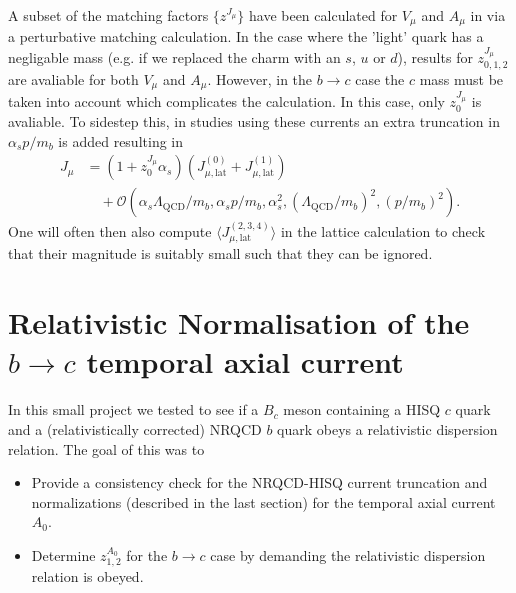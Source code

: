 A subset of the matching factors $\{z^{J_{\mu}}\}$ have been calculated for $V_{\mu}$ and $A_{\mu}$ in \cite{Monahan:2012dq} via a perturbative matching calculation. In the case where the 'light' quark has a negligable mass (e.g. if we replaced the charm with an $s$, $u$ or $d$), results for $z^{J_{\mu}}_{0,1,2}$ are avaliable for both $V_{\mu}$ and $A_{\mu}$. However, in the $b\to c$ case the $c$ mass must be taken into account which complicates the calculation. In this case, only $z^{J_{\mu}}_{0}$ is avaliable. To sidestep this, in studies using these currents an extra truncation in $\alpha_s p/m_b$ is added resulting in
\begin{align}
  \label{eq:nrqcd-hisq-current-truncate}
  J_{\mu} &= ( 1 + z^{J_{\mu}}_0 \alpha_s )( J_{\mu,\text{lat}}^{(0)} + J_{\mu,\text{lat}}^{(1)} ) \\ \nonumber &\quad + \mathcal{O}( \alpha_s \Lambda_{\text{QCD}} / m_b, \alpha_s p/m_b,  \alpha_s^2, (\Lambda_{\text{QCD}}/m_b)^2, (p/m_b)^2 ).
\end{align}
One will often then also compute $\langle J_{\mu,\text{lat}}^{(2,3,4)}\rangle$ in the lattice calculation to check that their magnitude is suitably small such that they can be ignored.

\section{Relativistic Normalisation of the $b\to c$ temporal axial current}
\label{sec:relativistic}

In this small project we tested to see if a $B_c$ meson containing a HISQ $c$ quark and a (relativistically corrected) NRQCD $b$ quark obeys a relativistic dispersion relation. The goal of this was to
\begin{itemize}
\item
  Provide a consistency check for the NRQCD-HISQ current truncation and normalizations (described in the last section) for the temporal axial current $A_0$.
\item
  Determine $z^{A_0}_{1,2}$ for the $b\to c$ case by demanding the relativistic dispersion relation is obeyed.
\end{itemize}

